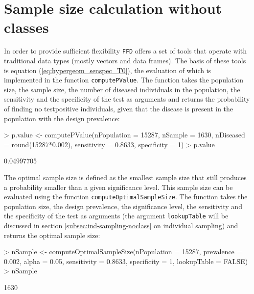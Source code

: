 \documentclass[nojss]{jss}
\begin{document}

\section{Sample size calculation without classes} \label{sec:using-ffd-noclass}

In order to provide sufficient flexibility \texttt{FFD} offers a set of tools that operate with traditional data types (mostly vectors and data frames). The basis of these tools is equation (\ref{eq:hypergeom_senspec_T0}), the evaluation of which is implemented in the function \texttt{computePValue}.  The function takes the population size, the sample size, the number of diseased individuals in the population, the sensitivity and the specificity of the test as arguments and returns the probability of finding no testpositive individuals, given that the disease is present in the population with the design prevalence:

\begin{Schunk}
\begin{Sinput}
> p.value <- computePValue(nPopulation = 15287, nSample = 1630,
       nDiseased = round(15287*0.002), sensitivity = 0.8633,
       specificity = 1)
> p.value
\end{Sinput}
\begin{Soutput}
[1] 0.04997705
\end{Soutput}
\end{Schunk}

The optimal sample size is defined as the smallest sample size that still produces a probability smaller than a given significance level. This sample size can be evaluated using the function \texttt{computeOptimalSampleSize}. The function takes the population size, the design prevalence, the significance level, the sensitivity and the specificity of the test as arguments (the argument \texttt{lookupTable} will be discussed in section \ref{subsec:ind-sampling-noclass} on individual sampling) and returns the optimal sample size:

\begin{Schunk}
\begin{Sinput}
> nSample <- computeOptimalSampleSize(nPopulation = 15287,
       prevalence = 0.002, alpha = 0.05, sensitivity = 0.8633,
       specificity = 1, lookupTable = FALSE)
> nSample
\end{Sinput}
\begin{Soutput}
[1] 1630
\end{Soutput}
\end{Schunk}
\end{document}
